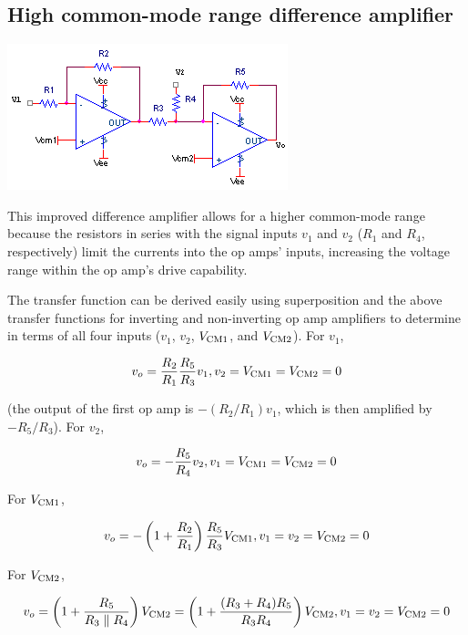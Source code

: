 \subsection{High common-mode range difference amplifier}
\begin{center}
	\includegraphics{schematics/highcmdifferenceamplifier.PNG}
\end{center}
This improved difference amplifier allows for a higher common-mode range because the resistors in series with the signal inputs $v_1$ and $v_2$ ($R_1$ and $R_4$, respectively) limit the currents into the op amps' inputs, increasing the voltage range within the op amp's drive capability. \autocite[418]{op-amps-for-everyone}

The transfer function can be derived easily using superposition and the above transfer functions for inverting and non-inverting op amp amplifiers to determine \vout in terms of all four inputs ($v_1$, $v_2$, $V_\mathrm{CM1}$, and $V_\mathrm{CM2}$).
For $v_1$,

\begin{equation}
\vout = \frac{R_2}{R_1}\frac{R_5}{R_3}v_1, v_2 = V\sub{CM1} = V\sub{CM2} = 0
\end{equation}

(the output of the first op amp is $-(R_2/R_1)v_1$, which is then amplified by $-R_5/R_3$).
For $v_2$,

\begin{equation}
\vout = -\frac{R_5}{R_4}v_2, v_1 = V\sub{CM1} = V\sub{CM2} = 0
\end{equation}

For $V_\mathrm{CM1}$,

\begin{equation}
\vout = -\left(1+\frac{R_2}{R_1}\right)\frac{R_5}{R_3}V\sub{CM1}, v_{1} = v_{2} = V\sub{CM2} = 0
\end{equation}

For $V_\mathrm{CM2}$,

\begin{equation}
\vout = \left(1+\frac{R_5}{R_3 \parallel R_4}\right)V\sub{CM2} = \left(1+\frac{(R_3+R_4)R_5}{R_3R_4}\right)V\sub{CM2}, v_1 = v_2 = V\sub{CM2} = 0
\end{equation}

